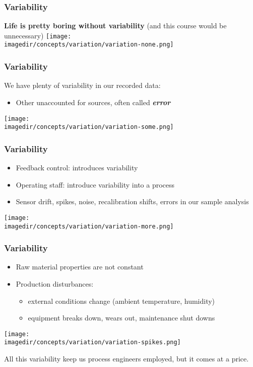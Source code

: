 \begin{frame}\frametitle{Variability}
	\textbf{Life is pretty boring without variability} (and this course would be unnecessary)
	\texttt{[image: \\imagedir/concepts/variation/variation-none.png]}
\end{frame}

\begin{frame}\frametitle{Variability}
	We have plenty of variability in our recorded data:
	\begin{itemize}
		\item Other unaccounted for sources, often called \textbf{\emph{error}}
	\end{itemize}
	\texttt{[image: \\imagedir/concepts/variation/variation-some.png]}
\end{frame}

\begin{frame}\frametitle{Variability}
	\begin{itemize}
		\item Feedback control: introduces variability
		\item Operating staff: introduce variability into a process
		\item Sensor drift, spikes, noise, recalibration shifts, errors in our sample analysis
	\end{itemize}

	\texttt{[image: \\imagedir/concepts/variation/variation-more.png]}
\end{frame}

\begin{frame}\frametitle{Variability}
	\begin{itemize}
		\item Raw material properties are not constant
		\item Production disturbances:
		\begin{itemize}
			\item external conditions change (ambient temperature, humidity)
			\item equipment breaks down, wears out, maintenance shut downs
		\end{itemize}
	\end{itemize}

	\texttt{[image: \\imagedir/concepts/variation/variation-spikes.png]}

	All this variability keep us process engineers employed, but it comes at a price.
\end{frame}

